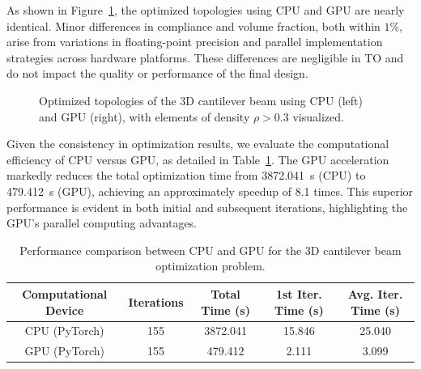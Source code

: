 \documentclass[mathpazo]{cicp}
\begin{document}
As shown in Figure~\ref{fig:canti3d_device_compare}, the optimized topologies using CPU and GPU are nearly identical. Minor differences in compliance and volume fraction, both within $1\%$, arise from variations in floating-point precision and parallel implementation strategies across hardware platforms. These differences are negligible in TO and do not impact the quality or performance of the final design.
\begin{figure}[htbp]
	\centering
	\caption{Optimized topologies of the 3D cantilever beam using CPU (left) and GPU (right), with elements of density $\rho > 0.3$ visualized.}
	\label{fig:canti3d_device_compare}
\end{figure}

Given the consistency in optimization results, we evaluate the computational efficiency of CPU versus GPU, as detailed in Table~\ref{tab:device_performance}. The GPU acceleration markedly reduces the total optimization time from \SI{3872.041}{s} (CPU) to \SI{479.412}{s} (GPU), achieving an approximately speedup of 8.1 times. This superior performance is evident in both initial and subsequent iterations, highlighting the GPU's parallel computing advantages.
\begin{table}[htbp]
	\centering
	\setlength{\tabcolsep}{4pt} %
	\caption{Performance comparison between CPU and GPU for the 3D cantilever beam optimization problem.}
	\begin{tabular}{ccccc}
		\toprule
		\textbf{Computational Device} & \textbf{Iterations} & \textbf{Total Time (s)} & \textbf{1st Iter. Time (s)} & \textbf{Avg. Iter. Time (s)} \\
		\midrule
		CPU (PyTorch) & 155 & 3872.041 & 15.846 & 25.040 \\
		GPU (PyTorch) & 155 & 479.412 & 2.111 & 3.099 \\
		\bottomrule
	\end{tabular}
	\label{tab:device_performance}
\end{table}
\end{document}
